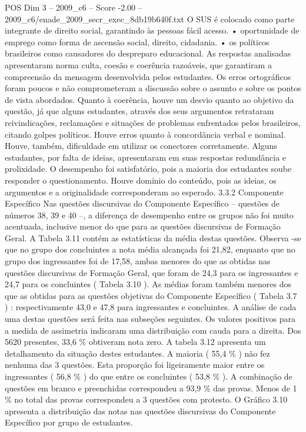 \begin{textsample}{POS Dim 3 – 2009\_c6 – Score -2.00 – 2009\_c6/enade\_2009\_secr\_exec\_8db19b640f.txt}
O SUS é colocado como parte integrante de direito social, garantindo às pessoas fácil acesso. • oportunidade de emprego como forma de ascensão social, direito, cidadania. • os políticos brasileiros como causadores do despreparo educacional.
As respostas analisadas apresentaram norma culta, coesão e coerência razoáveis, que garantiram a compreensão da mensagem desenvolvida pelos estudantes.
Os erros ortográficos foram poucos e não comprometeram a discussão sobre o assunto e sobre os pontos de vista abordados.
Quanto à coerência, houve um desvio quanto ao objetivo da questão, já que alguns estudantes, através dos seus argumentos retrataram reivindicações, reclamações e situações de problemas enfrentados pelos brasileiros, citando golpes políticos.
Houve erros quanto à concordância verbal e nominal.
Houve, também, dificuldade em utilizar os conectores corretamente.
Alguns estudantes, por falta de ideias, apresentaram em suas respostas redundância e prolixidade.
O desempenho foi satisfatório, pois a maioria dos estudantes soube responder o questionamento.
Houve domínio do conteúdo, pois as ideias, os argumentos e a originalidade corresponderam ao esperado. 3.3.2 Componente Específico Nas questões discursivas do Componente Específico – questões de números 38, 39 e 40 –, a diferença de desempenho entre os grupos não foi muito acentuada, inclusive menor do que para as questões discursivas de Formação Geral.
A Tabela 3.11 contém as estatísticas da média destas questões.
Observa -se que no grupo dos concluintes a nota média alcançada foi 21,82, enquanto que no grupo dos ingressantes foi de 17,58, ambas menores do que as obtidas nas questões discursivas de Formação Geral, que foram de 24,3 para os ingressantes e 24,7 para os concluintes ( Tabela 3.10 ).
As médias foram também menores dos que as obtidas para as questões objetivas do Componente Específico ( Tabela 3.7 ) : respectivamente 43,0 e 47,8 para ingressantes e concluintes.
A análise de cada uma destas questões será feita nas subseções seguintes.
Os valores positivos para a medida de assimetria indicaram uma distribuição com cauda para a direita.
Dos 5620 presentes, 33,6 \% obtiveram nota zero.
A tabela 3.12 apresenta um detalhamento da situação destes estudantes.
A maioria ( 55,4 \% ) não fez nenhuma das 3 questões.
Esta proporção foi ligeiramente maior entre os ingressantes ( 56,8 \% ) do que entre os concluintes ( 53,8 \% ).
A combinação de questões em branco e preenchidas correspondeu a 93,9 \% das provas.
Menos de 1 \% no total das provas correspondeu a 3 questões com protesto.
O Gráfico 3.10 apresenta a distribuição das notas nas questões discursivas do Componente Específico por grupo de estudantes.

\end{textsample}
